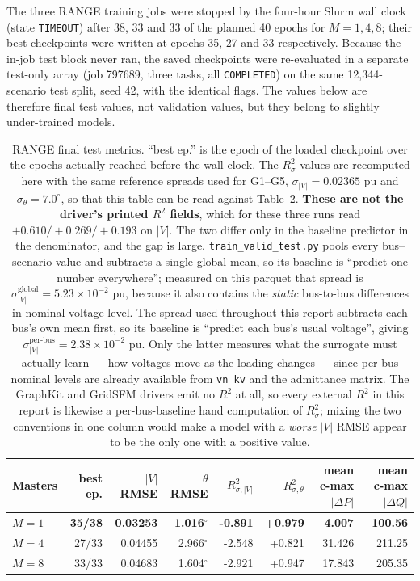 \documentclass[10pt]{article}
\begin{document}
The three RANGE training jobs were stopped by the four-hour Slurm wall clock
(state \texttt{TIMEOUT}) after 38, 33 and 33 of the planned 40 epochs for
$M=1,4,8$; their best checkpoints were written at epochs 35, 27 and 33
respectively.  Because the in-job test block never ran, the saved checkpoints
were re-evaluated in a separate test-only array (job 797689, three tasks, all
\texttt{COMPLETED}) on the same 12{,}344-scenario test split, seed 42, with the
identical flags.  The values below are therefore final test values, not
validation values, but they belong to slightly under-trained models.

\begin{table}[H]
\centering\footnotesize
\setlength{\tabcolsep}{3.5pt}
\begin{tabular}{lrrrrrrr}
\toprule
Masters & best ep. & $|V|$ RMSE & $\theta$ RMSE & $R^2_{\sigma,|V|}$ & $R^2_{\sigma,\theta}$ & mean c-max $|\Delta P|$ & mean c-max $|\Delta Q|$\\
\midrule
\textbf{$M=1$} & \textbf{35/38} & \textbf{0.03253} & \textbf{1.016$^\circ$} & \textbf{-0.891} & \textbf{+0.979} & \textbf{4.007} & \textbf{100.56}\\
$M=4$ & 27/33 & 0.04455 & 2.966$^\circ$ & -2.548 & +0.821 & 31.426 & 211.25\\
$M=8$ & 33/33 & 0.04683 & 1.604$^\circ$ & -2.921 & +0.947 & 17.843 & 205.35\\
\bottomrule
\end{tabular}
\caption{RANGE final test metrics.  ``best ep.'' is the epoch of the loaded
checkpoint over the epochs actually reached before the wall clock.  The
$R^2_{\sigma}$ values are recomputed here with the same reference spreads used for G1--G5,
$\sigma_{|V|}=0.02365$ pu and $\sigma_\theta=7.0^\circ$, so that this table can
be read against Table~2.  \textbf{These are not the driver's printed $R^2$
fields}, which for these three runs read $+0.610/+0.269/+0.193$ on $|V|$.  The
two differ only in the baseline predictor in the denominator, and the gap is
large.  \texttt{train\_valid\_test.py} pools every bus--scenario value and
subtracts a single global mean, so its baseline is ``predict one number
everywhere''; measured on this parquet that spread is
$\sigma_{|V|}^{\text{global}}=5.23\times10^{-2}$ pu, because it also contains
the \emph{static} bus-to-bus differences in nominal voltage level.  The spread
used throughout this report subtracts each bus's own mean first, so its
baseline is ``predict each bus's usual voltage'', giving
$\sigma_{|V|}^{\text{per-bus}}=2.38\times10^{-2}$ pu.  Only the latter measures
what the surrogate must actually learn --- how voltages move as the loading
changes --- since per-bus nominal levels are already available from
\texttt{vn\_kv} and the admittance matrix.  The GraphKit and GridSFM drivers
emit no $R^2$ at all, so every external $R^2$ in this report is likewise a
per-bus-baseline hand computation of $R^2_{\sigma}$; mixing the two conventions
in one column would make a model with a \emph{worse} $|V|$ RMSE appear to be
the only one with a positive value.}
\end{table}
\end{document}
